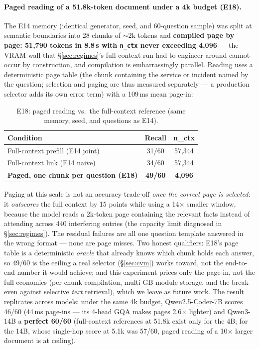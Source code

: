 \documentclass[11pt]{article}
\newcommand{\code}[1]{\texttt{#1}}
\begin{document}
\paragraph{Paged reading of a 51.8k-token document under a 4k budget (E18).}
The E14 memory (identical generator, seed, and 60-question sample) was split at semantic boundaries into 28 chunks of ${\sim}2$k tokens and \textbf{compiled page by page: 51{,}790 tokens in 8.8\,s with \code{n\_ctx} never exceeding 4{,}096} --- the VRAM wall that \S\ref{sec:regimes}'s full-context run had to engineer around cannot occur by construction, and compilation is embarrassingly parallel. Reading uses a deterministic page table (the chunk containing the service or incident named by the question; selection and paging are thus measured separately --- a production selector adds its own error term) with a 109\,ms mean page-in:

\begin{table}[h]
  \centering\small
  \caption{E18: paged reading vs.\ the full-context reference (same memory, seed, and questions as E14).}
  \label{tab:paged}
  \begin{tabular}{lcc}
    \toprule
    Condition & Recall & n\_ctx \\
    \midrule
    Full-context prefill (E14 joint) & 31/60 & 57{,}344 \\
    Full-context link (E14 naive) & 34/60 & 57{,}344 \\
    \textbf{Paged, one chunk per question (E18)} & \textbf{49/60} & \textbf{4{,}096} \\
    \bottomrule
  \end{tabular}
\end{table}

Paging at this scale is not an accuracy trade-off \emph{once the correct page is selected}: it \emph{outscores} the full context by 15 points while using a 14$\times$ smaller window, because the model reads a 2k-token page containing the relevant facts instead of attending across 440 interfering entries (the capacity limit diagnosed in \S\ref{sec:regimes}). The residual failures are all one question template answered in the wrong format --- none are page misses. Two honest qualifiers: E18's page table is a deterministic \emph{oracle} that already knows which chunk holds each answer, so 49/60 is the ceiling a real selector (\S\ref{sec:cvm}) works toward, not the end-to-end number it would achieve; and this experiment prices only the page-in, not the full economics (per-chunk compilation, multi-GB module storage, and the break-even against selective \emph{text} retrieval), which we leave as future work. The result replicates across models: under the same 4k budget, Qwen2.5-Coder-7B scores 46/60 (44\,ms page-ins --- its 4-head GQA makes pages 2.6$\times$ lighter) and Qwen3-14B a \textbf{perfect 60/60} (full-context references at 51.8k exist only for the 4B; for the 14B, whose single-hop score at 5.1k was 57/60, paged reading of a 10$\times$ larger document is at ceiling).
\end{document}
